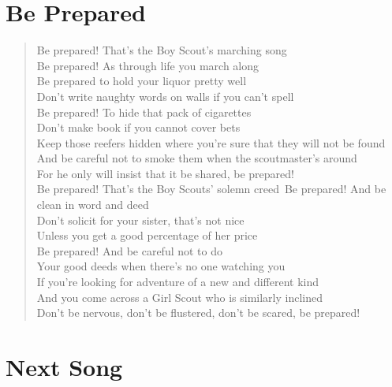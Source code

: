 \documentclass[twocolumn]{article}
\begin{document}
\section*{Be Prepared}

\begin{verse}

\small

Be prepared! That's the Boy Scout's marching song\\
Be prepared! As through life you march along\\
Be prepared to hold your liquor pretty well\\
Don't write naughty words on walls if you can't spell\\

Be prepared! To hide that pack of cigarettes\\
Don't make book if you cannot cover bets\\
Keep those reefers hidden where you're sure that they will not be found\\
And be careful not to smoke them when the scoutmaster's around\\
For he only will insist that it be shared, be prepared!\\

Be prepared! That's the Boy Scouts' solemn creed\
Be prepared! And be clean in word and deed\\
Don't solicit for your sister, that's not nice\\
Unless you get a good percentage of her price\\

Be prepared! And be careful not to do\\
Your good deeds when there's no one watching you\\
If you're looking for adventure of a new and different kind\\
And you come across a Girl Scout who is similarly inclined\\
Don't be nervous, don't be flustered, don't be scared, be prepared!\\

\end{verse}

\section*{Next Song}
\end{document}
